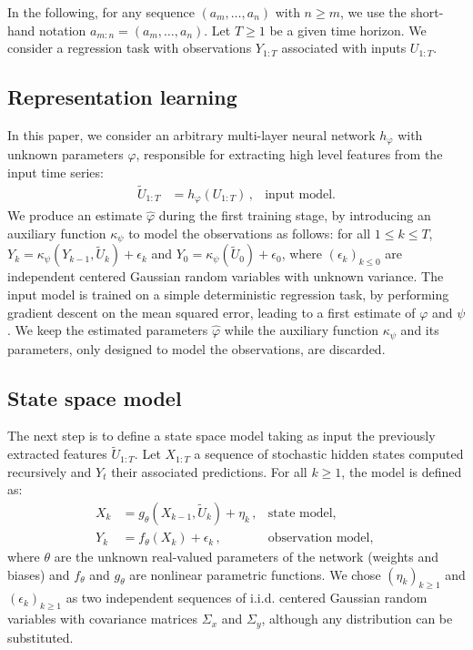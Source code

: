 \documentclass[conference]{IEEEtran}
\begin{document}
In the following, for any sequence $(a_m,\ldots, a_n)$ with $n\geq m$, we use the short-hand notation $a_{m:n} = (a_m,\ldots, a_n)$.
Let $T\ge 1$ be a given time horizon.
We consider a regression task with observations $Y_{1:T}$ associated with inputs $U_{1:T}$.

\subsection{Representation learning}%
In this paper, we consider an arbitrary multi-layer neural network $h_\varphi$ with unknown parameters $\varphi$, responsible for extracting high level features from the input time series:
\begin{align*}
	\widetilde U_{1:T} & = h_\varphi(U_{1:T})\,, & \text{input model.}
\end{align*}
We produce an estimate $\hat \varphi$ during the first training stage, by introducing an auxiliary function $\kappa_\psi$ to model the observations as follows: for all $1 \leq k \leq T$, $Y_k = \kappa_\psi(Y_{k-1}, \widetilde U_k) + \epsilon_k$ and $Y_0 = \kappa_\psi(\widetilde U_0) + \epsilon_0$, where $(\epsilon_k)_{k\leq 0}$ are independent centered Gaussian random variables with unknown variance.
The input model is trained on a simple deterministic regression task, by performing gradient descent on the mean squared error, leading to a first estimate of $\varphi$ and $\psi$.
We keep the estimated parameters $\hat \varphi$ while the auxiliary function $\kappa_\psi$ and its parameters, only designed to model the observations, are discarded.

\subsection{State space model}
\label{sub:proposed_architecture}
The next step is to define  a state space model taking as input the previously extracted features $\widetilde U_{1:T}$.
Let $X_{1:T}$ a sequence of stochastic hidden states computed recursively and $Y_t$ their associated predictions.
For all $k \geq 1$, the model is defined as:
\begin{align*}
	X_k & = g_\theta(X_{k-1}, \widetilde U_k) + \eta_k\,, & \text{state model, }       \\
	Y_k & = f_\theta(X_k) + \epsilon_k\,,                 & \text{observation model, }
\end{align*}
where $\theta$ are the unknown real-valued parameters of the network (weights and biases) and $f_\theta$ and $g_\theta$ are nonlinear parametric functions.
We chose $(\eta_k)_{k\geq 1}$ and $(\epsilon_k)_{k\geq 1}$ as two independent sequences of i.i.d. centered Gaussian random variables with covariance matrices $\Sigma_x$ and $\Sigma_y$, although any distribution can be substituted.
\end{document}
